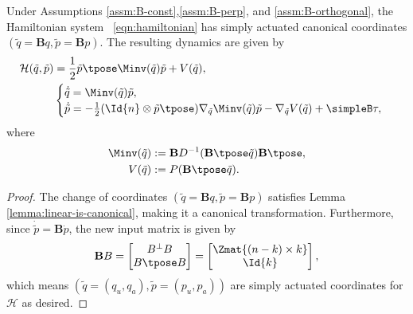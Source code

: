 \begin{thm}\label{thm:simply-actuated}
    Under Assumptions \ref{assm:B-const},\ref{assm:B-perp}, and
    \ref{assm:B-orthogonal}, the Hamiltonian system ~\eqref{eqn:hamiltonian}
    has simply actuated canonical coordinates 
    \(\left(\tilde{q} = \mathbf{B}q, \tilde{p} = \mathbf{B}p\right)\). 
    The resulting dynamics are given by 
    \begin{align}\label{eqn:simple-hamiltonian}
        \mathcal{H}(\tilde{q},\tilde{p}) &= 
        \frac{1}{2} \tilde{p}\tpose \Minv(\tilde{q}) \tilde{p} + V(\tilde{q})
        , \\
       &\begin{cases}
           \dot{\tilde{q}} = \Minv(\tilde{q})\tilde{p}
           , \\
           \dot{\tilde{p}} = -\frac{1}{2} (\Id{n} \otimes \tilde{p}\tpose)
           \nabla_{\tilde{q}} \Minv(\tilde{q}) \tilde{p}
           - \nabla_{\tilde{q}} V(\tilde{q}) + \simpleB \tau
            ,
        \end{cases} \nonumber
    \end{align}
    where
    \begin{align*}
        \Minv(\tilde{q}) &:= 
        \mathbf{B}D^{-1}(\mathbf{B}\tpose \tilde{q})\mathbf{B}\tpose
        , \\
        V(\tilde{q}) &:= P(\mathbf{B}\tpose \tilde{q})
        .
    \end{align*}
\end{thm}
\begin{proof}
    The change of coordinates \((\tilde{q} = \mathbf{B}q, \tilde{p} = \mathbf{B}p)\)
    satisfies Lemma \ref{lemma:linear-is-canonical}, making it a canonical
    transformation.
    Furthermore, since \(\dot{\tilde{p}} = \mathbf{B}\dot{p}\), the new input matrix is
    given by 
    \[
        \mathbf{B}B = \begin{bmatrix}
            B^\perp B \\
            B\tpose B \\
        \end{bmatrix} = 
        \begin{bmatrix}
            \Zmat{(n-k)\times k} \\
            \Id{k}
        \end{bmatrix}
        ,
    \]
    which means \(\left(\tilde{q} = (q_u,q_a), \tilde{p} = (p_u,p_a)\right)\) are simply
    actuated coordinates for \(\mathcal{H}\) as desired.
\end{proof}

